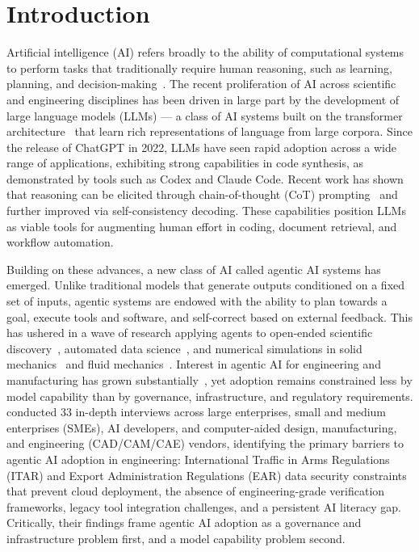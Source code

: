 \documentclass[preprint,review,10pt,number]{elsarticle}
\begin{document}
\linenumbers


%
\section{Introduction}
Artificial intelligence (AI) refers broadly to the ability of computational systems to perform tasks that traditionally require human reasoning, such as learning, planning, and decision-making~\cite{chang2024survey}. 
The recent proliferation of AI across scientific and engineering disciplines has been driven in large part by the development of large language models (LLMs) --- a class of AI systems built on the transformer architecture~\cite{vaswani2017attention} that learn rich representations of language from large corpora.
Since the release of ChatGPT in 2022, LLMs have seen rapid adoption across a wide range of applications, exhibiting strong capabilities in code synthesis, as demonstrated by tools such as Codex and Claude Code. Recent work has shown that reasoning can be elicited through chain-of-thought (CoT) prompting~\cite{wei2022chain} and further improved via self-consistency decoding. 
These capabilities position LLMs as viable 
tools for augmenting human effort in coding, document retrieval, and workflow automation.

Building on these advances, a new class of AI called agentic AI systems has emerged.
Unlike traditional models that generate outputs conditioned on a fixed set of inputs, agentic systems are endowed with the ability to plan towards a goal, execute tools and software, and self-correct based on external feedback.
This has ushered in a 
wave of research applying agents to open-ended scientific discovery~\cite{lu2024ai, gottweis2025towards, du2025accelerating}, automated data science~\cite{ou2025automind, jiang2025aide}, and numerical simulations in solid mechanics~\cite{ni2024mechagents, tian2024collaboration, deotale2026all} and fluid mechanics~\cite{yue2025foam, dong2025fine}.
Interest in agentic AI for engineering and manufacturing has grown substantially~\citep{edwards2026agentic, vishwasrao2026agentic}, yet adoption remains constrained less by model capability than by governance, infrastructure, and regulatory requirements. 
\citet{edwards2026agentic} conducted 33 in-depth interviews across large enterprises, small and medium enterprises (SMEs), AI developers, and computer-aided design, manufacturing, and engineering (CAD/CAM/CAE) vendors, identifying the primary barriers to agentic AI adoption in engineering: International Traffic in Arms Regulations (ITAR) and Export Administration Regulations (EAR) data security constraints that prevent cloud deployment, the absence of engineering-grade verification frameworks, legacy tool integration challenges, and a persistent AI literacy gap.
Critically, their findings frame 
agentic AI adoption as a governance and infrastructure problem first, and a model 
capability problem second.
\end{document}
